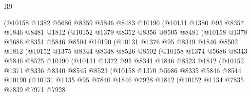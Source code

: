 \begin{lexlean}{R9}
\begin{coremodule}
              (@10158
                @1382
                @5686
                @8359
                @5846
                @8483
                @10190
                (@10131
                  @1380
                  @95
                  @8357
                  @1846
                  @8481
                  @1812
                  (@10152
                    @1379
                    @8352
                    @8356
                    @8505
                    @8481
                    (@10158
                      @1378
                      @5686
                      @8351
                      @5846
                      @8504
                      @10190
                      (@10131
                        @1376
                        @95
                        @8349
                        @1846
                        @8502
                        @1812
                        (@10152
                          @1375
                          @8344
                          @8348
                          @8526
                          @8502
                          (@10158
                            @1374
                            @5686
                            @8343
                            @5846
                            @8525
                            @10190
                            (@10131
                              @1372
                              @95
                              @8341
                              @1846
                              @8523
                              @1812
                              (@10152
                                @1371
                                @8336
                                @8340
                                @8545
                                @8523
                                (@10158
                                  @1370
                                  @5686
                                  @8335
                                  @5846
                                  @8544
                                  @10190
                                  (@10131
                                    @1135
                                    @95
                                    @7840
                                    @1846
                                    @7928
                                    @1812
                                    (@10152
                                      @1134
                                      @7835
                                      @7839
                                      @7971
                                      @7928

\end{coremodule}
\end{lexlean}
